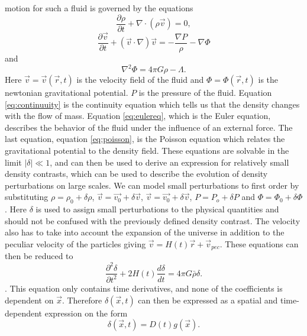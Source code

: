 motion for such a fluid is governed by the equations
\begin{equation}\label{eq:continuuity}
    \frac{\partial \rho}{\partial t} + \nabla\cdot(\rho \vec{v})=0,
\end{equation}
\begin{equation}\label{eq:eulereq}
    \frac{\partial \vec{v}}{\partial t} + (\vec{v}\cdot\nabla)\vec{v}=-\frac{\nabla P}{\rho}-\nabla \Phi
\end{equation}
and
\begin{equation}\label{eq:poisson}
    \nabla ^2\Phi=4\pi G\rho -\Lambda.
\end{equation}
Here $\vec{v}=\vec{v}(\vec{r},t)$ is the velocity field of the fluid and $\Phi=\Phi(\vec{r},t)$
is the newtonian gravitational potential. $P$ is the pressure of the fluid. Equation \ref{eq:continuuity} is the
continuity equation which tells us that the density changes with the flow of
mass. Equation \ref{eq:eulereq}, which is the Euler equation, describes the
behavior of the fluid under the influence of an external force. The last
equation, equation \ref{eq:poisson}, is the Poisson equation which relates the
gravitational potential to the density field. These equations are solvable in
the limit $\vert\delta\vert \ll 1$, and can then be used to derive an expression
for relatively small density contrasts, which can be used to describe the
evolution of density perturbations on large scales. We can model small perturbations to first order by substituting $\rho =
\rho_0 + \delta \rho$, $\vec{v} =\vec{v_0} + \delta \vec{v}$, $\vec{v} =\vec{v_0}
+ \delta \vec{v}$, $P = P_o + \delta P$ and $\Phi = \Phi_0 +\delta\Phi$. Here
$\delta$ is used to assign small perturbations to the physical quantities and should not be
confused with the previously defined density contrast. The velocity also has to
take into account the expansion of the universe in addition to the peculiar
velocity of the particles giving $\vec{v} = H(t)\vec{r} + \vec{v}_{pec}$. These
equations can then be reduced to 
\begin{equation}
    \frac{\partial^2 \delta}{\partial t^2} + 2H(t) \frac{d \delta}{dt}=4\pi G\bar{\rho}\delta.
\end{equation}
\cite[p.~345]{schneider2006extragalactic}. This equation only contains time derivatives, and none of the coefficients is dependent
on $\vec{x}$. Therefore $\delta(\vec{x}, t)$ can then be expressed as a spatial and time-dependent expression on the form 
\begin{equation}
    \delta(\vec{x}, t) = D(t)g(\vec{x}).
\end{equation}
